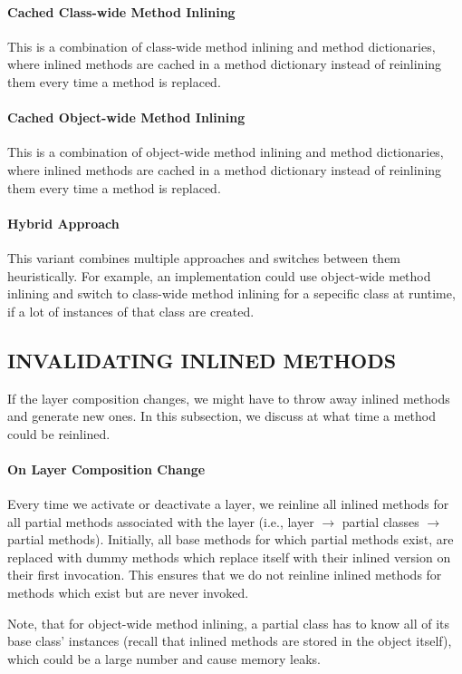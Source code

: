 \documentclass[english,paper=a4,twocolumn=true,DIV=calc,fontsize=9pt]{scrartcl}
\begin{document}
\paragraph{Cached Class-wide Method Inlining}
This is a combination of class-wide method inlining and method dictionaries, where inlined methods are cached in a method dictionary instead of reinlining them every time a method is replaced.

\paragraph{Cached Object-wide Method Inlining}
This is a combination of object-wide method inlining and method dictionaries, where inlined methods are cached in a method dictionary instead of reinlining them every time a method is replaced.

\paragraph{Hybrid Approach}
This variant combines multiple approaches and switches between them heuristically. For example, an implementation could use object-wide method inlining and switch to class-wide method inlining for a sepecific class at runtime, if a lot of instances of that class are created.

\subsection{INVALIDATING INLINED METHODS}
If the layer composition changes, we might have to throw away inlined methods and generate new ones. In this subsection, we discuss at what time a method could be reinlined.

\paragraph{On Layer Composition Change}
Every time we activate or deactivate a layer, we reinline all inlined methods for all partial methods associated with the layer (i.e., layer $\rightarrow$ partial classes $\rightarrow$ partial methods). Initially, all base methods for which partial methods exist, are replaced with dummy methods which replace itself with their inlined version on their first invocation. This ensures that we do not reinline inlined methods for methods which exist but are never invoked. 

Note, that for object-wide method inlining, a partial class has to know all of its base class' instances (recall that inlined methods are stored in the object itself), which could be a large number and cause memory leaks. 
\end{document}

